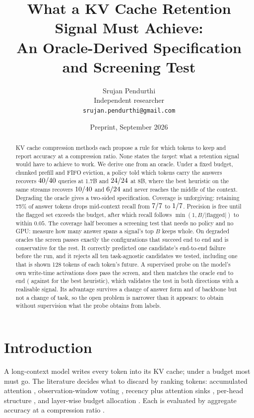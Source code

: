 \documentclass[10pt]{article}
\title{What a KV Cache Retention Signal Must Achieve:\\
       An Oracle-Derived Specification and Screening Test}
\author{Srujan Pendurthi\\Independent researcher\\\texttt{srujan.pendurthi@gmail.com}}
\date{Preprint, September 2026}
\begin{document}
\maketitle

\begin{abstract}
KV cache compression methods each propose a rule for which tokens to keep and
report accuracy at a compression ratio. None states the \emph{target}: what a
retention signal would have to achieve to work. We derive one from an oracle.
Under a fixed budget, chunked prefill and FIFO eviction, a policy told which
tokens carry the answers recovers $40/40$ queries at 1.7B and
$24/24$ at 8B, where the best heuristic on the same streams recovers
$10/40$ and $6/24$ and never reaches the middle of the context.
Degrading the oracle gives a two-sided specification. Coverage is unforgiving:
retaining 75\% of answer tokens drops mid-context recall from $7/7$ to
$1/7$. Precision is free until the flagged set exceeds the budget,
after which recall follows $\min(1, B/|\text{flagged}|)$ to within $0.05$.
The coverage half becomes a screening test that needs no policy and no GPU:
measure how many answer spans a signal's top $B$ keeps whole. On degraded
oracles the screen passes exactly the configurations that succeed end to end
and is conservative for the rest. It correctly predicted one candidate's
end-to-end failure before the run, and it rejects all ten task-agnostic
candidates we tested, including one that is shown 128 tokens of each token's
future. A supervised probe on the model's own write-time activations does pass
the screen, and then matches the oracle end to end (\ProbeESmall{} against
\RecentESmall{} for the best heuristic), which validates the test in both
directions with a realisable signal. Its advantage survives a change of answer
form and of backbone but not a change of task, so the open problem is narrower
than it appears: to obtain
without supervision what the probe obtains from labels.
\end{abstract}

\section{Introduction}\label{sec:intro}

A long-context model writes every token into its KV cache; under a budget most
must go. The literature decides what to discard by ranking tokens: accumulated
attention \citep{zhang2023h2o,liu2023scissorhands}, observation-window voting
\citep{li2024snapkv}, recency plus attention sinks \citep{xiao2024streamingllm},
per-head structure \citep{ge2024fastgen}, and layer-wise budget allocation
\citep{cai2024pyramidkv,feng2024adakv}. Each is evaluated by aggregate accuracy
at a compression ratio \citep{yuan2024kvbench,li2025scbench}.
\end{document}
